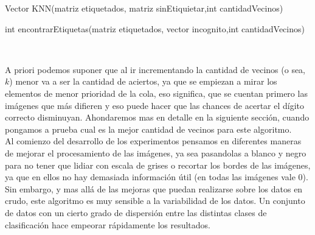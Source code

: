 \begin{algorithm}
\begin{algorithmic}[1]\parskip=1mm
\caption{Vector KNN(matriz etiquetados, matriz sinEtiquietar,int cantidadVecinos)}
\ENDFOR
{}
\end{algorithmic}
\end{algorithm}

\begin{algorithm}
\begin{algorithmic}[1]\parskip=1mm
\caption{int encontrarEtiquetas(matriz etiquetados, vector incognito,int cantidadVecinos)}
\ENDFOR
{}
\ENDWHILE\\
\end{algorithmic}
\end{algorithm}

A priori podemos suponer que al ir incrementando la cantidad de vecinos (o sea, $k$) menor va a ser la cantidad de aciertos, ya que se empiezan a mirar los elementos de menor prioridad de la cola, eso significa, que se cuentan primero las imágenes que más difieren y eso puede hacer que las chances de acertar el dígito correcto disminuyan. Ahondaremos mas en detalle en la siguiente sección, cuando pongamos a prueba cual es la mejor cantidad de vecinos para este algoritmo.
\\
Al comienzo del desarrollo de los experimentos pensamos en diferentes maneras de mejorar el procesamiento de las imágenes, ya sea pasandolas a blanco y negro para no tener que lidiar con escala de grises o recortar los bordes de las imágenes, ya que en ellos no hay demasiada información útil (en todas las imágenes vale 0).
\\
Sin embargo, y mas allá de las mejoras que puedan realizarse sobre los datos en crudo, este algoritmo es muy sensible a la variabilidad de los datos. Un conjunto de datos con un cierto grado de dispersión entre las distintas clases de clasificación hace empeorar rápidamente los resultados.

